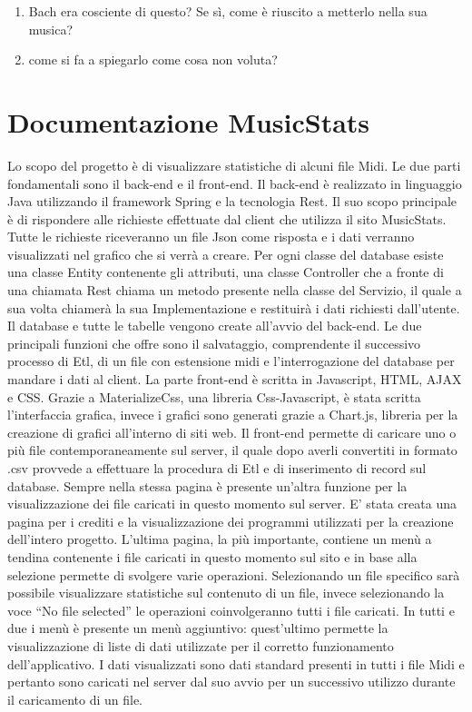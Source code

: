 \documentclass[12pt]{article}
\begin{document}
\begin{enumerate}
    \item Bach era cosciente di questo? Se sì, come è riuscito a metterlo nella sua musica?
    \item come si fa a spiegarlo come cosa non voluta?
\end{enumerate}

\section{Documentazione MusicStats}
Lo scopo del progetto è di visualizzare statistiche di alcuni file Midi.
Le due parti fondamentali sono il back-end e il front-end.
Il back-end è realizzato in linguaggio Java utilizzando il framework Spring e la tecnologia Rest.
Il suo scopo principale è di rispondere alle richieste effettuate dal client che utilizza il sito
MusicStats.
Tutte le richieste riceveranno un file Json come risposta e i dati verranno visualizzati nel grafico
che si verrà a creare.
Per ogni classe del database esiste una classe Entity contenente gli attributi, una classe Controller
che a fronte di una chiamata Rest chiama un metodo presente nella classe del Servizio, il quale a
sua volta chiamerà la sua Implementazione e restituirà i dati richiesti dall’utente.
Il database e tutte le tabelle vengono create all’avvio del back-end.
Le due principali funzioni che offre sono il salvataggio, comprendente il successivo processo di Etl,
di un file con estensione midi e l’interrogazione del database per mandare i dati al client.
La parte front-end è scritta in Javascript, HTML, AJAX e CSS.
Grazie a MaterializeCss, una libreria Css-Javascript, è stata scritta l’interfaccia grafica, invece i
grafici sono generati grazie a Chart.js, libreria per la creazione di grafici all’interno di siti web.
Il front-end permette di caricare uno o più file contemporaneamente sul server, il quale dopo
averli convertiti in formato .csv provvede a effettuare la procedura di Etl e di inserimento di record
sul database.
Sempre nella stessa pagina è presente un’altra funzione per la visualizzazione dei file caricati in
questo momento sul server.
E’ stata creata una pagina per i crediti e la visualizzazione dei programmi utilizzati per la creazione
dell’intero progetto.
L’ultima pagina, la più importante, contiene un menù a tendina contenente i file caricati in questo
momento sul sito e in base alla selezione permette di svolgere varie operazioni.
Selezionando un file specifico sarà possibile visualizzare statistiche sul contenuto di un file, invece
selezionando la voce “No file selected” le operazioni coinvolgeranno tutti i file caricati.
In tutti e due i menù è presente un menù aggiuntivo: quest’ultimo permette la visualizzazione di
liste di dati utilizzate per il corretto funzionamento dell’applicativo.
I dati visualizzati sono dati standard presenti in tutti i file Midi e pertanto sono caricati nel server
dal suo avvio per un successivo utilizzo durante il caricamento di un file.
\end{document}
